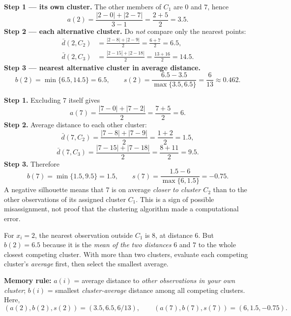 \textbf{Step 1 --- its own cluster.} The other members of $C_1$ are $0$ and $7$, hence
\[
a(2)=\frac{|2-0|+|2-7|}{3-1}=\frac{2+5}{2}=\boxed{3.5}.
\]
\textbf{Step 2 --- each alternative cluster.} Do \emph{not} compare only the nearest points:
\[
\begin{aligned}
\bar d(2,C_2)&=\frac{|2-8|+|2-9|}{2}=\frac{6+7}{2}=6.5,\\
\bar d(2,C_3)&=\frac{|2-15|+|2-18|}{2}=\frac{13+16}{2}=14.5.
\end{aligned}
\]
\textbf{Step 3 --- nearest alternative cluster in average distance.}
\[
b(2)=\min\{6.5,14.5\}=\boxed{6.5},\qquad
s(2)=\frac{6.5-3.5}{\max\{3.5,6.5\}}=\boxed{\frac{6}{13}\approx0.462}.
\]

\textbf{Step 1.} Excluding $7$ itself gives
\[
a(7)=\frac{|7-0|+|7-2|}{2}=\frac{7+5}{2}=\boxed{6}.
\]
\textbf{Step 2.} Average distance to each other cluster:
\[
\bar d(7,C_2)=\frac{|7-8|+|7-9|}{2}=\frac{1+2}{2}=1.5,
\]
\[
\bar d(7,C_3)=\frac{|7-15|+|7-18|}{2}=\frac{8+11}{2}=9.5.
\]
\textbf{Step 3.} Therefore
\[
b(7)=\min\{1.5,9.5\}=\boxed{1.5},\qquad
s(7)=\frac{1.5-6}{\max\{6,1.5\}}=\boxed{-0.75}.
\]
A negative silhouette means that $7$ is on average \emph{closer to cluster $C_2$} than to the other observations of its assigned cluster $C_1$. This is a sign of possible misassignment, not proof that the clustering algorithm made a computational error.

For $x_i=2$, the nearest observation outside $C_1$ is $8$, at distance $6$. But $b(2)=6.5$ because it is the \emph{mean of the two distances} $6$ and $7$ to the whole closest competing cluster. With more than two clusters, evaluate each competing cluster's \emph{average} first, then select the smallest average.

\begin{answer}
\textbf{Memory rule:} $a(i)$ = average distance to \emph{other observations in your own cluster}; $b(i)$ = smallest \emph{cluster-average} distance among all competing clusters. Here,
\[
\boxed{(a(2),b(2),s(2))=(3.5,6.5,6/13)},\qquad
\boxed{(a(7),b(7),s(7))=(6,1.5,-0.75)}.
\]
\end{answer}

